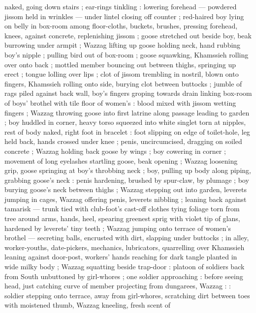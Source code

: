 naked, going down stairs ; ear-rings tinkling : lowering forehead --- powdered jissom held in
wrinkles --- under lintel closing off counter ; red-haired boy lying on belly in box-room among
floor-cloths, buckets, brushes, pressing forehead, knees, against concrete, replenishing jissom ;
goose stretched out beside boy, beak burrowing under armpit ; Wazzag lifting up goose holding neck,
hand rubbing boy's nipple ; pulling bird out of box-room{\td}  ; %
goose squawking, Khamssieh rolling over onto back ; mottled member bouncing out between thighs,
springing up erect ; tongue lolling over lips ; clot of jissom trembling in nostril, blown onto
fingers, Khamssieh rolling onto side, burying clot between buttocks ; jumble of rags piled against
back wall, boy's fingers groping towards drain linking box-room of boys' brothel with tile floor of
women's : blood mixed with jissom wetting fingers ; Wazzag throwing goose into first latrine along
passage leading to garden ; boy huddled in corner, heavy torso squeezed into white singlet torn at
nipples, rest of body naked, right foot in bracelet : foot slipping on edge of toilet-hole, leg held
back, hands crossed under knee ; penis, uncircumcised, dragging on soiled concrete ; Wazzag holding
back goose by wings ; boy cowering in corner ; movement of long eyelashes startling goose, beak
opening ; Wazzag loosening grip, goose springing at boy's throbbing neck ; boy, pulling up body
along piping, grabbing goose's neck : penis hardening, brushed by spur-claw, by plumage ; boy
burying goose's neck between thighs ; Wazzag stepping out into garden, leverets jumping in cages,
Wazzag offering penis, leverets nibbling ; leaning back against tamarisk --- trunk tied with
club-foot's cast-off clothes {\dashcom} tying foliage torn from tree around arms, hands, heel, spearing
greenest sprig with violet tip of glans, hardened by leverets' tiny teeth ; Wazzag jumping onto
terrace of women's brothel --- secreting balls, encrusted with dirt, slapping under buttocks ; in
alley, worker-youths, date-pickers, mechanics, lubricators, quarrelling over Khamssieh leaning
against door-post, workers' hands reaching for dark tangle planted in wide milky body ; Wazzag
squatting beside trap-door : platoon of soldiers back from South unbuttoned by girl-whores ; one
soldier approaching : before seeing head, just catching curve of member projecting from dungarees,
Wazzag : {\td} : soldier stepping onto terrace, away from
girl-whores, scratching dirt between toes with moistened thumb, Wazzag kneeling, fresh scent of
